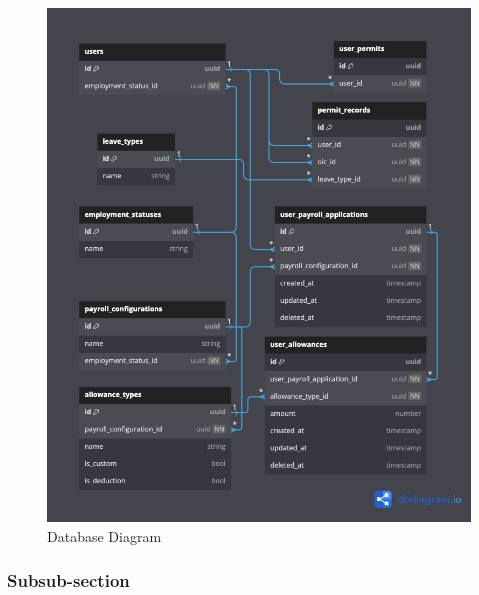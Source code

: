 \begin{figure}[H]
    \centering
    \includegraphics[width=1\textwidth]{assets/pics/fig_database_diagram.png}
    \caption{Database Diagram}
    \label{fig:db-schema}
\end{figure}



\subsubsection{Subsub-section}

\lipsum[13-14]


